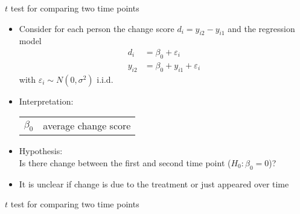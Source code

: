 \documentclass[aspectratio=169]{beamer}
\begin{document}
\begin{frame}{$t$ test for comparing two time points}
\begin{itemize}
  \item Consider for each person the change score $d_i = y_{i2} - y_{i1}$
    and the regression model
    \begin{align*}
         d_i &= \beta_0 + \varepsilon_i \\
      y_{i2} &= \beta_0 + y_{i1} + \varepsilon_i
    \end{align*}
    with $\varepsilon_i \sim N(0, \sigma^2)$ i.i.d.
  \item Interpretation:
    \begin{center}
    \begin{tabular}{ll}
    $\beta_0$ & average change score
    \end{tabular}
    \end{center}
  \item Hypothesis:\\
        Is there change between the first and second time point ($H_0\colon \beta_0 = 0$)?
  \item It is unclear if change is due to the treatment or just appeared
    over time
\end{itemize}
\end{frame}

\begin{frame}{$t$ test for comparing two time points}
\begin{center}
\end{center}
\end{frame}
\end{document}
